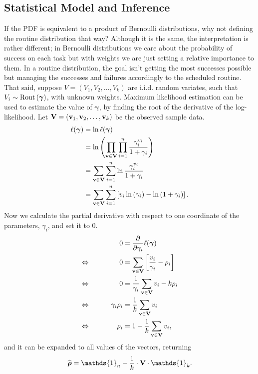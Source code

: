 \documentclass{article}
\newcommand{\0}{\mathbbold{0}}
\newcommand{\1}{\mathds{1}}
\newcommand{\2}{\mathbbold{2}}
\newcommand{\LRA}{\Leftrightarrow\mkern40mu}
\newcommand{\Rout}[1]{\textup{Rout}\left(#1\right)}
\begin{document}
\subsection{Statistical Model and Inference}
If the PDF is equivalent to a product of Bernoulli distributions, why not defining the routine distribution that way? Although it is the same, the interpretation is rather different; in Bernoulli distributions we care about the probability of success on each task but with weights we are just setting a relative importance to them.
In a routine distribution, the goal isn't getting the most successes possible but managing the successes and failures accordingly to the scheduled routine.
That said, suppose $V = \left(V_1, V_2, \dots, V_k\right)$ are i.i.d. random variates, such that $V_i \sim \Rout{\boldsymbol \gamma}$, with unknown weights. Maximum likelihood estimation can be used to estimate the value of ${\boldsymbol \gamma}$, by finding the root of the derivative of the log-likelihood.
Let ${\bf V} = \left({\bf v}_1, {\bf v}_2, \dots, {\bf v}_k\right)$ be the observed sample data.
\begin{align*}
    \ell({\boldsymbol \gamma}) &= \ln \ell({\boldsymbol \gamma}) \\
    &= \ln \left(\prod_{{\bf v}\in{\bf V}}\prod_{i=1}^{n}\frac{\gamma_i^{v_i}}{1+\gamma_i}\right) \\
    &= \sum_{{\bf v}\in{\bf V}}\sum_{i=1}^{n}\ln\frac{\gamma_i^{v_i}}{1+\gamma_i} \\
    &= \sum_{{\bf v}\in{\bf V}}\sum_{i=1}^{n}\left[v_i\ln\left(\gamma_i\right) - \ln\left(1+\gamma_i\right) \right].
\end{align*}
Now we calculate the partial derivative with respect to one coordinate of the parameters, $\gamma_i$, and set it to $0$.
\begin{alignat*}{2}
    && 0 &= \frac{\partial}{\partial \gamma_i} \ell({\boldsymbol \gamma}) \\
    \LRA && 0 &= \sum_{{\bf v}\in{\bf V}}\left[\frac{v_i}{\gamma_i} - \rho_i\right] \\
    \LRA && 0 &= \frac{1}{\gamma_i}\sum_{{\bf v}\in{\bf V}}v_i - k\rho_i \\
    \LRA && \gamma_i \rho_i &= \frac{1}{k}\sum_{{\bf v}\in{\bf V}}v_i \\
    \LRA && \rho_i &= 1 - \frac{1}{k}\sum_{{\bf v}\in{\bf V}}v_i,
\end{alignat*}
and it can be expanded to all values of the vectors, returning
\begin{equation*}
    \widehat{\boldsymbol \rho} = \1_n - \frac{1}{k}\cdot {\bf V} \cdot \1_k.
\end{equation*}
\end{document}
